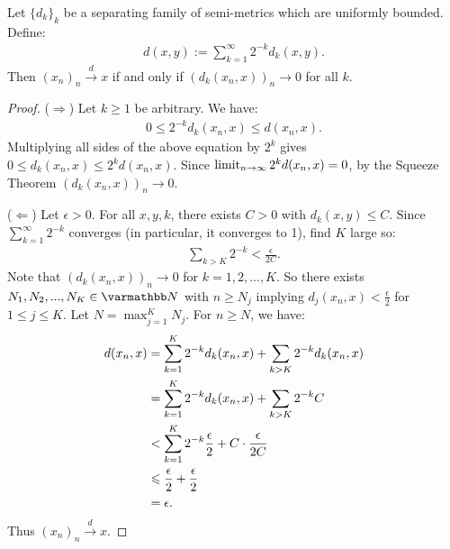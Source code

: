     \begin{proposition}
        Let $\{d_k\}_k$ be a separating family of semi-metrics which are uniformly bounded. Define:
            \begin{equation*}
            \begin{split}
                d(x,y) := \sum_{k = 1}^\infty 2^{-k}d_k(x,y).
            \end{split}
            \end{equation*}
        Then $(x_n)_n \xrightarrow{d} x$ if and only if $(d_k(x_n,x))_n \rightarrow 0$ for all $k$.
    \end{proposition}
        \begin{proof}
            ($\Rightarrow$) Let $k \geq 1$ be arbitrary. We have:
                \begin{equation*}
                \begin{split}
                    0 \leq 2^{-k}d_k(x_n,x) \leq d(x_n,x).
                \end{split}
                \end{equation*}
            Multiplying all sides of the above equation by $2^k$ gives $0 \leq d_k(x_n,x) \leq 2^k d(x_n,x)$. Since $\limit_{n \rightarrow \infty}2^kd(x_n,x) = 0$, by the Squeeze Theorem $(d_k(x_n,x))_n \rightarrow 0$.

            ($\Leftarrow$) Let $\epsilon > 0$. For all $x,y,k$, there exists $C > 0$ with $d_k(x,y) \leq C$. Since $\sum_{k = 1}^\infty 2^{-k}$ converges (in particular, it converges to 1), find $K$ large so:
                \begin{equation*}
                \begin{split}
                    \sum_{k > K}2^{-k} < \frac{\epsilon}{2C}.
                \end{split}
                \end{equation*}
            Note that $(d_k(x_n,x))_n \rightarrow 0$ for $k = 1,2,...,K$. So there exists $N_1,N_2,...,N_K \in \bfN$ with $n \geq N_j$ implying $d_j(x_n,x)<\frac{\epsilon}{2}$ for $1 \leq j \leq K$. Let $N = \max_{j = 1}^K N_j$. For $n \geq N$, we have:
                \begin{equation*}
                \begin{split}
                    d(x_n,x) 
                    & = \sum_{k = 1}^K 2^{-k}d_k(x_n,x) + \sum_{k > K}2^{-k}d_k(x_n,x) \\
                    & = \sum_{k = 1}^K 2^{-k}d_k(x_n,x) + \sum_{k > K}2^{-k} C \\
                    & < \sum_{k = 1}^K 2^{-k} \frac{\epsilon}{2} + C \cdot \frac{\epsilon}{2C} \\
                    & \leq \frac{\epsilon}{2} + \frac{\epsilon}{2} \\
                    & = \epsilon. \qedhere
                \end{split}
                \end{equation*}
            Thus $(x_n)_n \xrightarrow{d} x$.
            \end{proof}


